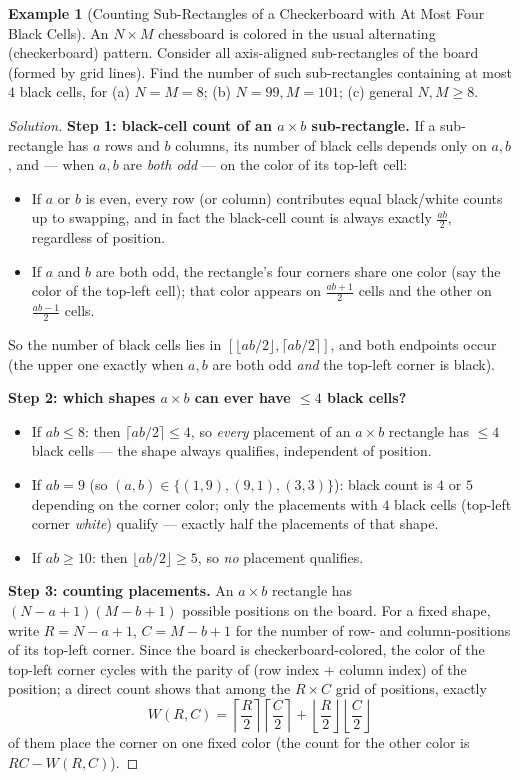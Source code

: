 \documentclass[11pt]{article}
\theoremstyle{definition}
\newtheorem{example}{Example}[section]
\begin{document}
\begin{example}[Counting Sub-Rectangles of a Checkerboard with At Most Four Black Cells]
An $N\times M$ chessboard is colored in the usual alternating (checkerboard) pattern. Consider all axis-aligned sub-rectangles of the board (formed by grid lines). Find the number of such sub-rectangles containing at most $4$ black cells, for (a) $N=M=8$; (b) $N=99,M=101$; (c) general $N,M\ge8$.
\end{example}
\begin{proof}[Solution]
\textbf{Step 1: black-cell count of an $a\times b$ sub-rectangle.} If a sub-rectangle has $a$ rows and $b$ columns, its number of black cells depends only on $a,b$, and — when $a,b$ are \emph{both odd} — on the color of its top-left cell:
\begin{itemize}
\item If $a$ or $b$ is even, every row (or column) contributes equal black/white counts up to swapping, and in fact the black-cell count is always exactly $\frac{ab}{2}$, regardless of position.
\item If $a$ and $b$ are both odd, the rectangle's four corners share one color (say the color of the top-left cell); that color appears on $\frac{ab+1}{2}$ cells and the other on $\frac{ab-1}{2}$ cells.
\end{itemize}
So the number of black cells lies in $\left[\lfloor ab/2\rfloor,\lceil ab/2\rceil\right]$, and both endpoints occur (the upper one exactly when $a,b$ are both odd \emph{and} the top-left corner is black).

\textbf{Step 2: which shapes $a\times b$ can ever have $\le4$ black cells?}
\begin{itemize}
\item If $ab\le8$: then $\lceil ab/2\rceil\le4$, so \emph{every} placement of an $a\times b$ rectangle has $\le4$ black cells — the shape always qualifies, independent of position.
\item If $ab=9$ (so $(a,b)\in\{(1,9),(9,1),(3,3)\}$): black count is $4$ or $5$ depending on the corner color; only the placements with $4$ black cells (top-left corner \emph{white}) qualify — exactly half the placements of that shape.
\item If $ab\ge10$: then $\lfloor ab/2\rfloor\ge5$, so \emph{no} placement qualifies.
\end{itemize}

\textbf{Step 3: counting placements.} An $a\times b$ rectangle has $(N-a+1)(M-b+1)$ possible positions on the board. For a fixed shape, write $R=N-a+1$, $C=M-b+1$ for the number of row- and column-positions of its top-left corner. Since the board is checkerboard-colored, the color of the top-left corner cycles with the parity of (row index $+$ column index) of the position; a direct count shows that among the $R\times C$ grid of positions, exactly
\[
W(R,C)=\left\lceil\frac{R}{2}\right\rceil\left\lceil\frac{C}{2}\right\rceil+\left\lfloor\frac{R}{2}\right\rfloor\left\lfloor\frac{C}{2}\right\rfloor
\]
of them place the corner on one fixed color (the count for the other color is $RC-W(R,C)$).


\end{proof}
\end{document}
